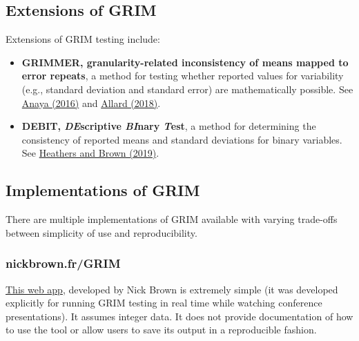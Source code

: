 \documentclass[letterpaper, 12pt]{article}
\begin{document}
\subsection*{Extensions of GRIM}

Extensions of GRIM testing include:

\begin{itemize}
    \setlength\itemsep{-0.5em}
    \item \textbf{GRIMMER, granularity-related inconsistency of means mapped to error repeats}, a method for testing whether reported values for variability (e.g., standard deviation and standard error) are mathematically possible. See \href{https://doi.org/10.7287/peerj.preprints.2400v1}{Anaya (2016)} and \href{https://aurelienallard.netlify.app/post/anaytic-grimmer-possibility-standard-deviations/}{Allard (2018)}.
    \item \textbf{DEBIT, \textit{DE}scriptive \textit{BI}nary \textit{T}est}, a method for determining the consistency of reported means and standard deviations for binary variables. See \href{https://doi.org/10.17605/OSF.IO/PM825}{Heathers and Brown (2019)}.
\end{itemize}

\subsection*{Implementations of GRIM}

There are multiple implementations of GRIM available with varying trade-offs between simplicity of use and reproducibility.

\subsubsection*{nickbrown.fr/GRIM}

\href{http://nickbrown.fr/GRIM}{This web app}, developed by Nick Brown is extremely simple (it was developed explicitly for running GRIM testing in real time while watching conference presentations). It assumes integer data. It does not provide documentation of how to use the tool or allow users to save its output in a reproducible fashion.

\end{document}
